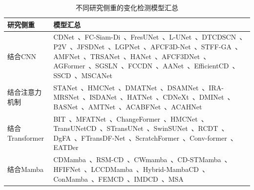 \begin{table}
\centering
\scriptsize
\caption{不同研究侧重的变化检测模型汇总}
\label{tab:cd_models_summary}
\begin{tabularx}{\textheight}{@{}l X@{}} %
\toprule
\textbf{研究侧重} & \textbf{模型汇总} \\
\midrule
结合CNN & CDNet~\cite{Alcantarilla2016StreetviewCD}、FC-Siam-Di~\cite{Daudt2018FullyCS}、FresUNet~\cite{Daudt2018MultitaskLF}、L-UNet~\cite{Papadomanolaki2021ADM}、DTCDSCN~\cite{Liu2019BuildingCD}、P2V~\cite{lin_transition_2023}、JFSDNet~\cite{Zhou2022JointFD}、LGPNet~\cite{Liu2022BuildingCD}、AFCF3D-Net~\cite{Ye2023AdjacentLevelFC}、STFF-GA~\cite{h_wei_spatio-temporal_2024}、AMFNet~\cite{zhan_amfnet_2024}、TRSANet~\cite{j_li_trsanet_2024}、HANet~\cite{Han2024HANetAH}、AFCF3DNet~\cite{ye_adjacent-level_2023}、AGFormer~\cite{Chen2025AGFormerAA}、SGSLN~\cite{zhao_exchanging_2023}、FCCDN~\cite{Chen2021FCCDNFC}、AANet~\cite{Hang2024AANetAA}、EfficientCD~\cite{dong_efficientcd_2024}、SSCD~\cite{Wang2024SummatorSubtractorNM}、MSCANet~\cite{m_liu_cnn-transformer_2022}\\
\midrule
结合注意力机制 & STANet~\cite{chen_spatial-temporal_2020}、HMCNet~\cite{Wang2022HMCNetHE}、DMATNet~\cite{Song2022RemoteSI}、DSAMNet~\cite{shi_deeply_2022}、IRA-MRSNet~\cite{Ling2022IRAMRSNetAN}、ISDANet~\cite{h_ren_interactive_2025}、HATNet~\cite{Xu2024HybridAT}、CDNeXt~\cite{wei_robust_2024}、DMINet~\cite{feng_change_2023}、BASNet~\cite{z_wang_bitemporal_2024}、AMTNet~\cite{Liu2023AnAM}、ACABFNet~\cite{Song2023AxialCA}、ACAHNet~\cite{Zhang2023AsymmetricCH}\\
\midrule
结合Transformer & BIT~\cite{chen_remote_2022}、MFATNet~\cite{Mao2022MFATNetMF}、ChangeFormer~\cite{bandara2022transformer}、HMCNet~\cite{Wang2022HMCNetHE}、TransUNetCD~\cite{Li2022TransUNetCDAH}、STransUNet~\cite{Yuan2022STransUNetAS}、SwinSUNet~\cite{zhang_swinsunet_2022}、RCDT~\cite{Lu2022RCDTRR}、DgFA~\cite{f_zhou_dual-granularity_2025}、FTransDF-Net~\cite{li_dual_2025}、ScratchFormer~\cite{Noman2023RemoteSC}、Conv-former~\cite{Yang2025ConvFormerCDHC}、EATDer~\cite{Ma2024EATDerEA}\\
\midrule
结合Mamba & CDMamba~\cite{zhang_cdmamba_2025}、RSM-CD~\cite{zhao_rs-mamba_2024}、CWmamba~\cite{Liu2025CWmambaLC}、CD-STMamba~\cite{Liu2025CDSTMambaTR}、HFIFNet~\cite{Han2025HFIFNetHF}、LCCDMamba~\cite{Huang2025LCCDMambaVS}、Hybrid-MambaCD~\cite{Feng2025HybridMambaCDHM}、ConMamba~\cite{Dong2024ConMambaCA}、FEMCD~\cite{Xing2025FrequencyEnhancedMF}、IMDCD~\cite{Liu2024IterativeMD}、MSA~\cite{Huang2025MSAMS}\\

\end{tabularx}
\end{table}
